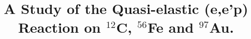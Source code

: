 \documentclass[aps,prl,twocolumn,showpacs,amsmath,amssymb,floats]{revtex4}
\begin{document}
\def\Journal#1#2#3#4{{#1} {\bf #2}, #3 (#4)}
\def\NCA{\rm Nuovo Cimento}
\def\NIM{\rm Nucl. Instrum. Methods}
\def\NIMA{{\rm Nucl. Instrum. Methods} A}
\def\NPB{{\rm Nucl. Phys.} B}
\def\PLB{{\rm Phys. Lett.}  B}
\def\PRL{\rm Phys. Rev. Lett.}
\def\PRD{{\rm Phys. Rev.} D}
\def\PRC{{\rm Phys. Rev.} C}
\def\ZPC{{\rm Z. Phys.} C}
\def\JPG{{\rm J. Phys.} G}
\def\st{\scriptstyle}
\def\sst{\scriptscriptstyle}
\def\mco{\multicolumn}
\def\epp{\epsilon^{\prime}}
\def\vep{\varepsilon}
\def\ra{\rightarrow}
\def\ppg{\pi^+\pi^-\gamma}
\def\vp{{\bf p}}
\def\ko{K0}
\def\kb{\bar{K0}}
\def\al{\alpha}
\def\ab{\bar{\alpha}}
\def\be{\begin{equation}}
\def\ee{\end{equation}}
\def\bea{\begin{eqnarray}}
\def\eea{\end{eqnarray}}
\def\CPbar{\hbox{{\rm CP}\hskip-1.80em{/}}}%
%
\title{\large \bf A Study of the Quasi-elastic (e,e'p) Reaction on $^{12}$C, 
$^{56}$Fe and $^{97}$Au.}
\end{document}
